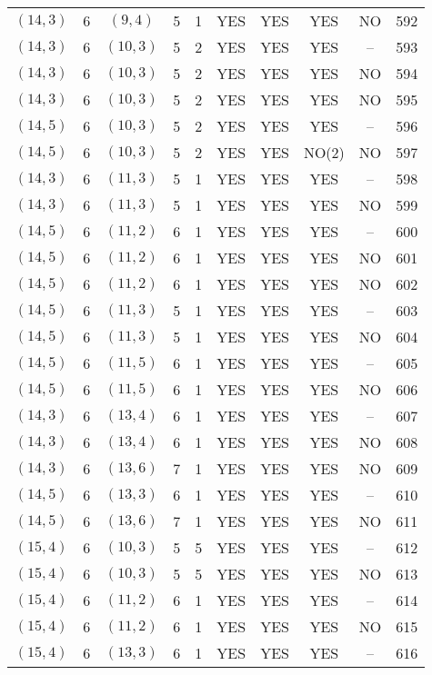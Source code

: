 \begin{longtable}{|c|c|c|c|c|c|c|c|c|c|}
$(14, 3)$ & 6 & $(9, 4)$ & 5 & 1 & YES & YES & YES & NO & 592\\
$(14, 3)$ & 6 & $(10, 3)$ & 5 & 2 & YES & YES & YES & -- & 593\\
$(14, 3)$ & 6 & $(10, 3)$ & 5 & 2 & YES & YES & YES & NO & 594\\
$(14, 3)$ & 6 & $(10, 3)$ & 5 & 2 & YES & YES & YES & NO & 595\\
$(14, 5)$ & 6 & $(10, 3)$ & 5 & 2 & YES & YES & YES & -- & 596\\
$(14, 5)$ & 6 & $(10, 3)$ & 5 & 2 & YES & YES & NO(2) & NO & 597\\
$(14, 3)$ & 6 & $(11, 3)$ & 5 & 1 & YES & YES & YES & -- & 598\\
$(14, 3)$ & 6 & $(11, 3)$ & 5 & 1 & YES & YES & YES & NO & 599\\
$(14, 5)$ & 6 & $(11, 2)$ & 6 & 1 & YES & YES & YES & -- & 600\\
$(14, 5)$ & 6 & $(11, 2)$ & 6 & 1 & YES & YES & YES & NO & 601\\
$(14, 5)$ & 6 & $(11, 2)$ & 6 & 1 & YES & YES & YES & NO & 602\\
$(14, 5)$ & 6 & $(11, 3)$ & 5 & 1 & YES & YES & YES & -- & 603\\
$(14, 5)$ & 6 & $(11, 3)$ & 5 & 1 & YES & YES & YES & NO & 604\\
$(14, 5)$ & 6 & $(11, 5)$ & 6 & 1 & YES & YES & YES & -- & 605\\
$(14, 5)$ & 6 & $(11, 5)$ & 6 & 1 & YES & YES & YES & NO & 606\\
$(14, 3)$ & 6 & $(13, 4)$ & 6 & 1 & YES & YES & YES & -- & 607\\
$(14, 3)$ & 6 & $(13, 4)$ & 6 & 1 & YES & YES & YES & NO & 608\\
$(14, 3)$ & 6 & $(13, 6)$ & 7 & 1 & YES & YES & YES & NO & 609\\
$(14, 5)$ & 6 & $(13, 3)$ & 6 & 1 & YES & YES & YES & -- & 610\\
$(14, 5)$ & 6 & $(13, 6)$ & 7 & 1 & YES & YES & YES & NO & 611\\
$(15, 4)$ & 6 & $(10, 3)$ & 5 & 5 & YES & YES & YES & -- & 612\\
$(15, 4)$ & 6 & $(10, 3)$ & 5 & 5 & YES & YES & YES & NO & 613\\
$(15, 4)$ & 6 & $(11, 2)$ & 6 & 1 & YES & YES & YES & -- & 614\\
$(15, 4)$ & 6 & $(11, 2)$ & 6 & 1 & YES & YES & YES & NO & 615\\
$(15, 4)$ & 6 & $(13, 3)$ & 6 & 1 & YES & YES & YES & -- & 616\\

\end{longtable}
